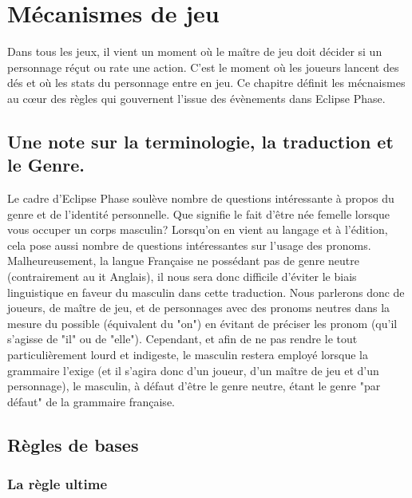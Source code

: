 \chapter{Mécanismes de jeu} \label{chap:game-mechanics} 

Dans tous les jeux, il vient un moment où le maître de jeu doit décider si un personnage réçut ou rate une action. C'est le moment où les joueurs lancent des dés et où les stats du personnage entre en jeu. Ce chapitre définit les mécnaismes au cœur des règles qui gouvernent l'issue des évènements dans Eclipse Phase. 

\section{Une note sur la terminologie, la traduction et le Genre.} Le cadre d'Eclipse Phase soulève nombre de questions intéressante à propos du genre et de l'identité personnelle. Que signifie le fait d'être née femelle lorsque vous occuper un corps masculin? Lorsqu'on en vient au langage et à l'édition, cela pose aussi nombre de questions intéressantes sur l'usage des pronoms. Malheureusement, la langue Française ne possédant pas de genre neutre (contrairement au it Anglais), il nous sera donc difficile d'éviter le biais linguistique en faveur du masculin dans cette traduction.   Nous parlerons donc de joueurs, de maître de jeu, et de personnages avec des pronoms neutres dans la mesure du possible (équivalent du "on") en évitant de préciser les pronom (qu'il s'agisse de "il" ou de "elle"). Cependant, et afin de ne pas rendre le tout particulièrement lourd et indigeste, le masculin restera employé lorsque la grammaire l'exige (et il s'agira donc d'un joueur, d'un maître de jeu et d'un personnage), le masculin, à défaut d'être le genre neutre, étant le genre "par défaut" de la grammaire française.   



\section{Règles de bases} \label{sec:basics} 

\subsection{La règle ultime} \label{sec:ultimate-rule} 

